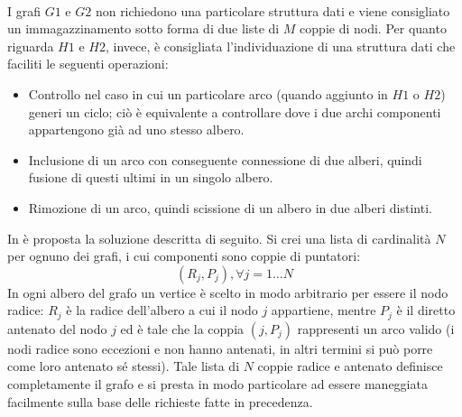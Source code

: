\paragraph{}
I grafi $G1$ e $G2$ non richiedono una particolare struttura dati e viene consigliato un immagazzinamento sotto forma di due liste di $M$ coppie di nodi. Per quanto riguarda $H1$ e $H2$, invece, è consigliata l'individuazione di una struttura dati che faciliti le seguenti operazioni:
\begin{itemize}
 \item Controllo nel caso in cui un particolare arco (quando aggiunto in $H1$ o $H2$) generi un ciclo; ciò è equivalente a controllare dove i due archi componenti appartengono già ad uno stesso albero.
 \item Inclusione di un arco con conseguente connessione di due alberi, quindi fusione di questi ultimi in un singolo albero.
 \item Rimozione di un arco, quindi scissione di un albero in due alberi distinti.
\end{itemize}
In \cite{Grimbleby} è proposta la soluzione descritta di seguito. Si crei una lista di cardinalità $N$ per ognuno dei grafi, i cui componenti sono coppie di puntatori:
$$(R_j, P_j), \forall j=1\dots N$$
In ogni albero del grafo un vertice è scelto in modo arbitrario per essere il nodo radice: $R_j$ è la radice dell'albero a cui il nodo $j$ appartiene, mentre $P_j$ è il diretto antenato del nodo $j$ ed è tale che la coppia $(j, P_j)$ rappresenti un arco valido (i nodi radice sono eccezioni e non hanno antenati, in altri termini si può porre come loro antenato sé stessi). Tale lista di $N$ coppie radice e antenato definisce completamente il grafo e si presta in modo particolare ad essere maneggiata facilmente sulla base delle richieste fatte in precedenza.

